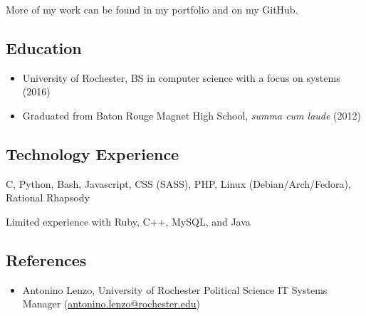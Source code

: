 \documentclass[10pt]{article}
\begin{document}
\vspace{-0.75em}
More of my work can be found in my portfolio and on my GitHub.



\subsection*{Education}

\begin{itemize}
	\item University of Rochester, BS in computer science with a focus on systems (2016)
	\item Graduated from Baton Rouge Magnet High School, \textit{summa cum laude} (2012)
\end{itemize}



\subsection*{Technology Experience}

C, Python, Bash, Javascript, CSS (SASS), PHP, Linux (Debian/Arch/Fedora), Rational Rhapsody

Limited experience with Ruby, C++, MySQL, and Java



\subsection*{References}

\begin{itemize}
	\item Antonino Lenzo, University of Rochester Political Science IT Systems Manager (\href{mailto://antonino.lenzo@rochester.edu}{antonino.lenzo@rochester.edu})
\end{itemize}
\end{document}
